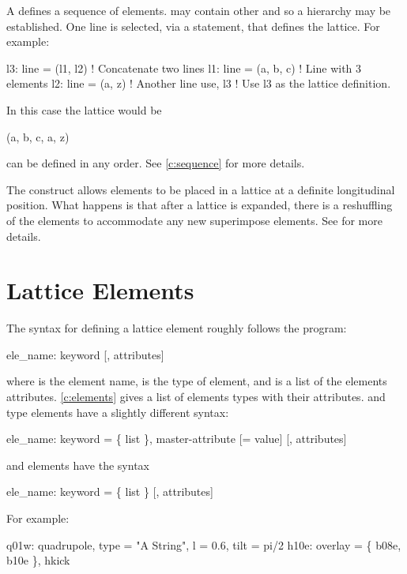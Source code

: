 A  defines a sequence of elements.  may contain
other  and so a hierarchy may be established. One line is
selected, via a  statement, that defines the lattice. For
example:
\begin{example}
  l3: line = (l1, l2)   ! Concatenate two lines
  l1: line = (a, b, c)  ! Line with 3 elements
  l2: line = (a, z)     ! Another line 
  use, l3               ! Use l3 as the lattice definition.
\end{example}
In this case the lattice would be
\begin{example}
  (a, b, c, a, z)
\end{example}
 can be defined in any order. See \cref{c:sequence} for more
details.

The  construct allows elements to be placed in a
lattice at a definite longitudinal position. What happens is that
after a lattice is expanded, there is a reshuffling of the elements to
accommodate any new superimpose elements. See  for more
details.

\section{Lattice Elements}

The syntax for defining a lattice element roughly follows the
\mad\cite{b:maduser} program:
\begin{example}
  ele_name: keyword [, attributes]
\end{example}
where  is the element name,  is the type of
element, and  is a list of the elements
attributes. \cref{c:elements} gives a list of elements types with
their attributes.
 and  type elements have a slightly different syntax:
\begin{example}
  ele_name: keyword = \{ list \}, master-attribute [= value] [, attributes]
\end{example}
and  elements have the syntax
\begin{example}
  ele_name: keyword = \{ list \} [, attributes]
\end{example}  
For example:
\begin{example}
  q01w: quadrupole, type = "A String", l = 0.6, tilt = pi/2
  h10e: overlay = \{ b08e, b10e \}, hkick
\end{example}

